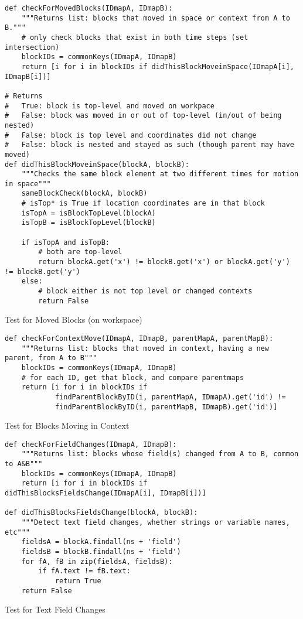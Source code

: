 \begin{listing}[]
\begin{verbatim}
def checkForMovedBlocks(IDmapA, IDmapB):
    """Returns list: blocks that moved in space or context from A to B."""
    # only check blocks that exist in both time steps (set intersection)
    blockIDs = commonKeys(IDmapA, IDmapB)
    return [i for i in blockIDs if didThisBlockMoveinSpace(IDmapA[i], IDmapB[i])]

# Returns
#   True: block is top-level and moved on workpace
#   False: block was moved in or out of top-level (in/out of being nested)
#   False: block is top level and coordinates did not change
#   False: block is nested and stayed as such (though parent may have moved)
def didThisBlockMoveinSpace(blockA, blockB):
    """Checks the same block element at two different times for motion in space"""
    sameBlockCheck(blockA, blockB)
    # isTop* is True if location coordinates are in that block
    isTopA = isBlockTopLevel(blockA)
    isTopB = isBlockTopLevel(blockB)

    if isTopA and isTopB:
        # both are top-level
        return blockA.get('x') != blockB.get('x') or blockA.get('y') != blockB.get('y')
    else:
        # block either is not top level or changed contexts
        return False
\end{verbatim}
\caption{Test for Moved Blocks (on workspace)}
\end{listing}

\begin{listing}[]
\begin{verbatim}
def checkForContextMove(IDmapA, IDmapB, parentMapA, parentMapB):
    """Returns list: blocks that moved in context, having a new parent, from A to B"""
    blockIDs = commonKeys(IDmapA, IDmapB)
    # for each ID, get that block, and compare parentmaps
    return [i for i in blockIDs if
            findParentBlockByID(i, parentMapA, IDmapA).get('id') !=
            findParentBlockByID(i, parentMapB, IDmapB).get('id')]
\end{verbatim}
\caption{Test for Blocks Moving in Context}
\end{listing}

\begin{listing}[]
\begin{verbatim}
def checkForFieldChanges(IDmapA, IDmapB):
    """Returns list: blocks whose field(s) changed from A to B, common to A&B"""
    blockIDs = commonKeys(IDmapA, IDmapB)
    return [i for i in blockIDs if didThisBlocksFieldsChange(IDmapA[i], IDmapB[i])]

def didThisBlocksFieldsChange(blockA, blockB):
    """Detect text field changes, whether strings or variable names, etc"""
    fieldsA = blockA.findall(ns + 'field')
    fieldsB = blockB.findall(ns + 'field')
    for fA, fB in zip(fieldsA, fieldsB):
        if fA.text != fB.text:
            return True
    return False
\end{verbatim}
\caption{Test for Text Field Changes}
\end{listing}

